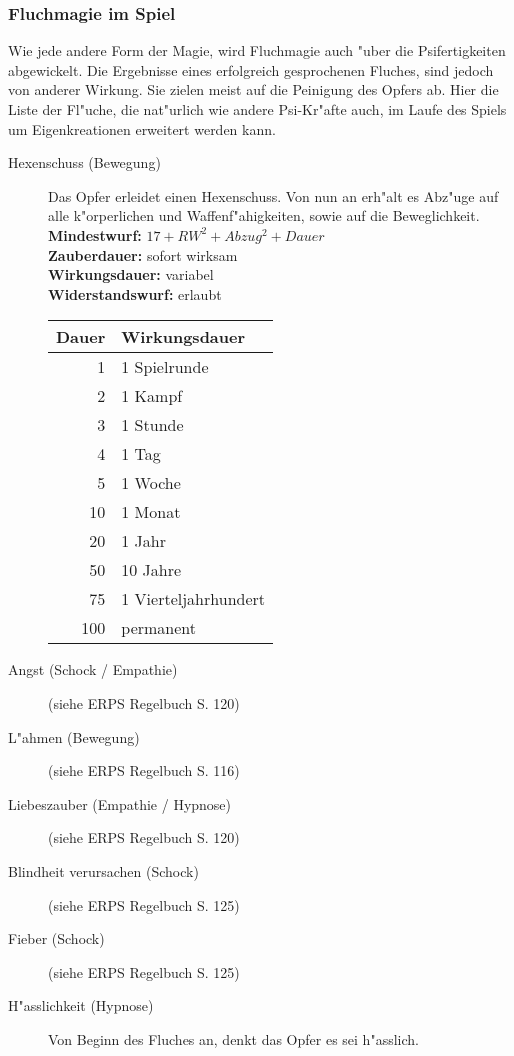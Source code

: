 \subsubsection{Fluchmagie im Spiel}
\par Wie jede andere Form der Magie, wird Fluchmagie auch "uber die Psifertigkeiten abgewickelt. Die 
Ergebnisse eines erfolgreich gesprochenen Fluches, sind jedoch von anderer Wirkung. Sie zielen meist 
auf die Peinigung des Opfers ab. Hier die Liste der Fl"uche, die nat"urlich wie andere Psi-Kr"afte auch, 
im Laufe des Spiels um Eigenkreationen erweitert werden kann.
\begin{description}
\item [Hexenschuss (Bewegung)] Das Opfer erleidet einen Hexenschuss. Von nun an erh"alt es 
Abz"uge auf alle k"orperlichen und Waffenf"ahigkeiten, sowie auf die Beweglichkeit.\\
\textbf{Mindestwurf:} $ 17+RW^2+Abzug^2+Dauer $\\
\textbf{Zauberdauer:} sofort wirksam\\
\textbf{Wirkungsdauer:} variabel\\
\textbf{Widerstandswurf:} erlaubt\\
\begin{tabular}{r|l}
Dauer & Wirkungsdauer\\
\hline
1 & 1 Spielrunde\\
2 & 1 Kampf\\
3 & 1 Stunde\\
4 & 1 Tag\\
5 & 1 Woche\\
10 & 1 Monat\\
20 & 1 Jahr\\
50 & 10 Jahre\\
75 & 1 Vierteljahrhundert\\
100 & permanent\\
\end{tabular}
\item [Angst (Schock / Empathie)] (siehe ERPS Regelbuch S. 120)
\item [L"ahmen (Bewegung)] (siehe ERPS Regelbuch S. 116)
\item [Liebeszauber (Empathie / Hypnose)] (siehe ERPS Regelbuch S. 120)
\item [Blindheit verursachen (Schock)] (siehe ERPS Regelbuch S. 125)
\item [Fieber (Schock)] (siehe ERPS Regelbuch S. 125)
\item [H"asslichkeit (Hypnose)] Von Beginn des Fluches an, denkt das Opfer es sei h"asslich.

\end{description}
